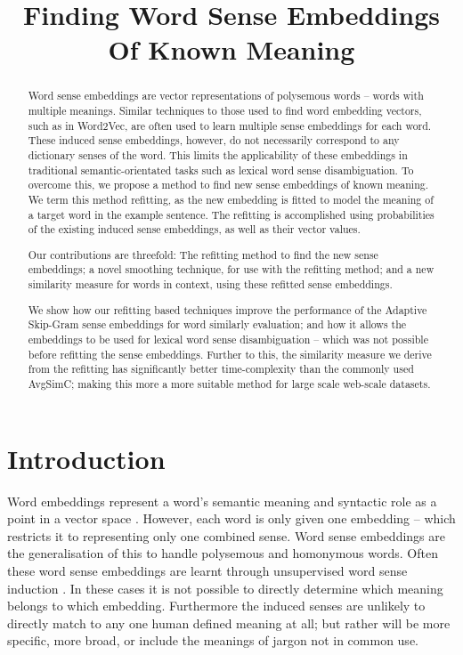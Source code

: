\documentclass{sig-alternate}
\begin{document}
\title{Finding Word Sense Embeddings Of Known Meaning}

\maketitle

\begin{abstract}
Word sense embeddings are vector representations of polysemous words -- words with multiple meanings. Similar techniques to those used to find word embedding vectors, such as in Word2Vec, are often used to learn multiple sense embeddings for each word.
These induced sense embeddings, however, do not necessarily correspond to any dictionary senses of the word.
This limits the applicability of these embeddings in traditional semantic-orientated tasks such as lexical word sense disambiguation.
To overcome this, we propose a method to find new sense embeddings of known meaning.
We term this method refitting, as the new embedding is fitted to model the meaning of a target word in the example sentence. The refitting is accomplished using probabilities of the existing induced sense embeddings, as well as their vector values.

Our contributions are threefold:
The refitting method to find the new sense embeddings;
a novel smoothing technique, for use with the refitting method;
and a new similarity measure for words in context, using these refitted sense embeddings.

We show how our refitting based techniques improve the performance of the Adaptive Skip-Gram sense embeddings for word similarly evaluation; and how it allows the embeddings to be used for lexical word sense disambiguation -- which was not possible before refitting the sense embeddings.
Further to this, the similarity measure we derive from the refitting has significantly better time-complexity than the commonly used AvgSimC; making this more a more suitable method for large scale web-scale datasets.
\end{abstract}


\section{Introduction}


Word embeddings represent a word's semantic meaning and syntactic role as a point in a vector space \parencite{NPLM, collobert2008unified, mikolov2013efficient}. However, each word is only given one embedding -- which restricts it to representing only one combined sense. Word sense embeddings are the generalisation of this to handle polysemous and homonymous  words. Often these word sense embeddings are learnt through unsupervised word sense induction \parencite{Reisinger2010,Huang2012,tian2014probabilistic, AdaGrams}. In these cases it is not possible to directly determine which meaning belongs to which embedding. Furthermore the induced senses are unlikely to directly match to any one human defined meaning at all; but rather will be more specific, more broad, or include the meanings of jargon not in common use.
\end{document}
